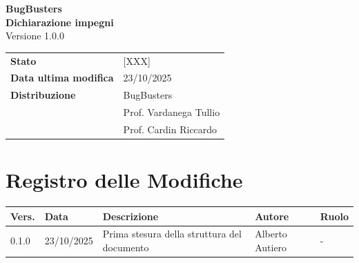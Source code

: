 \documentclass[a4paper,11pt]{article}
\begin{document}
\begin{center}
  \thispagestyle{empty}
  {\Large\bfseries BugBusters}\\[0.8cm]

  {\Huge\bfseries Dichiarazione impegni}\\[0.8cm]
  {\Large Versione 1.0.0}\\[0.8cm]
\end{center}

\begin{center}
\begin{tcolorbox}[colback=lightgray,width=0.85\textwidth,arc=3mm,boxrule=0.5pt]
\begin{tabular}{@{}ll@{}}
\textbf{Stato} & [XXX] \\
\textbf{Data ultima modifica} & 23/10/2025 \\
\textbf{Distribuzione} & BugBusters \\
 & Prof. Vardanega Tullio \\
 & Prof. Cardin Riccardo \\
\end{tabular}
\end{tcolorbox}
\end{center}

\newpage

\section*{Registro delle Modifiche}

{\footnotesize
\begin{center}
\begin{tabular}{|l|l|l|l|l|}
\hline
\textbf{Vers.} & \textbf{Data} & \textbf{Descrizione} & \textbf{Autore} & \textbf{Ruolo} \\
\hline
0.1.0 & 23/10/2025 & Prima stesura della struttura del documento & Alberto Autiero & - \\
\hline
\end{tabular}
\end{center}
}
\end{document}
